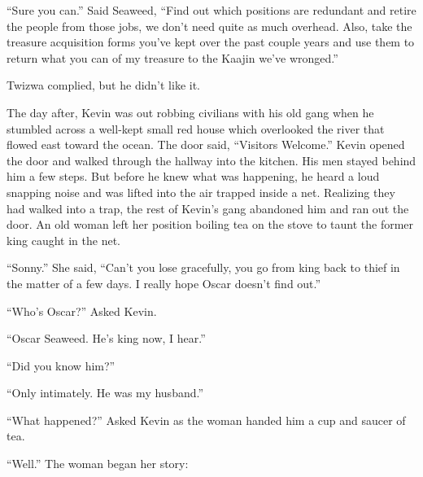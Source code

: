 ``Sure you can.'' Said Seaweed, ``Find out which positions are redundant and retire the people from those jobs, we don't need quite as much overhead. Also, take the treasure acquisition forms you've kept over the past couple years and use them to return what you can of my treasure to the Kaajin we've wronged.''

Twizwa complied, but he didn't like it.

\tbreak

The day after, Kevin was out robbing civilians with his old gang when he stumbled across a well-kept small red house which overlooked the river that flowed east toward the ocean. The door said, ``Visitors Welcome.''
Kevin opened the door and walked through the hallway into the kitchen. His men stayed behind him a few steps.
But before he knew what was happening, he heard a loud snapping noise and was lifted into the air trapped inside a net.
Realizing they had walked into a trap, the rest of Kevin's gang abandoned him and ran out the door. 
An old woman left her position boiling tea on the stove to taunt the former king caught in the net.

``Sonny.'' She said, ``Can't you lose gracefully, you go from king back to thief in the matter of a few days. I really hope Oscar doesn't find out.''

``Who's Oscar?'' Asked Kevin.

``Oscar Seaweed. He's king now, I hear.''

``Did you know him?''

``Only intimately. He was my husband.''

``What happened?'' Asked Kevin as the woman handed him a cup and saucer of tea.

``Well.'' The woman began her story:


